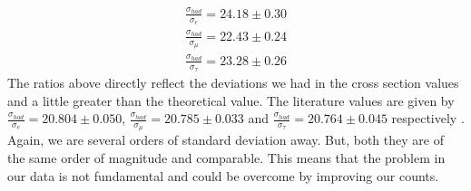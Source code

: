 \begin{equation}
\begin{split}
    \frac{\sigma_{had}}{\sigma_e} = 24.18 \pm 0.30 \\
    \frac{\sigma_{had}}{\sigma_{\mu}} = 22.43 \pm 0.24 \\
    \frac{\sigma_{had}}{\sigma_{\tau}} = 23.28 \pm 0.26
\end{split}
\end{equation}
The ratios above directly reflect the deviations we had in the cross section values and a little greater than the theoretical value. The literature values are given by $\frac{\sigma_{had}}{\sigma_e} = 20.804 \pm 0.050$, $\frac{\sigma_{had}}{\sigma_{\mu}} = 20.785 \pm 0.033$ and $\frac{\sigma_{had}}{\sigma_{\tau}} = 20.764 \pm 0.045$ respectively \cite{pdg2}. Again, we are several orders of standard deviation away. But, both they are of the same order of magnitude and comparable. This means that the problem in our data is not fundamental and could be overcome by improving our counts.

